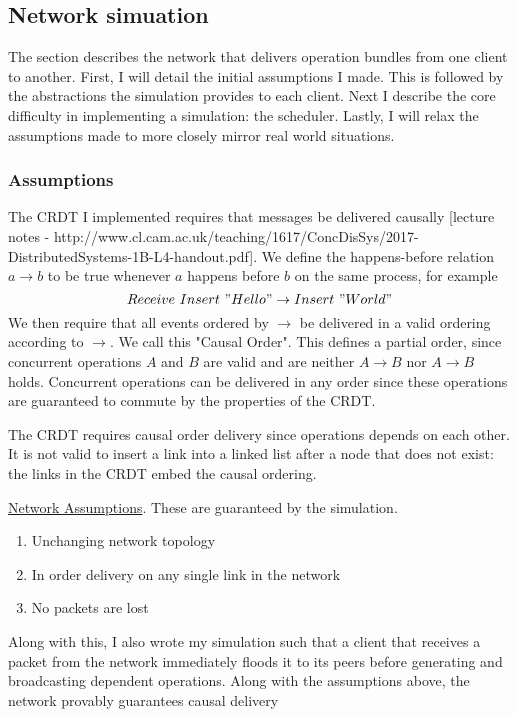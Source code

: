 \documentclass[12pt,a4paper,twoside,openright]{report}
\begin{document}
	\subsection{Network simuation}
		The section describes the network that delivers operation bundles from one client to another. First, I will detail the initial assumptions I made. This is followed by the abstractions the simulation provides to each client. Next I describe the core difficulty in implementing a simulation: the scheduler. Lastly, I will relax the assumptions made to more closely mirror real world situations.
		
		\subsubsection{Assumptions} 
		The CRDT I implemented requires that messages be delivered causally [lecture notes - http://www.cl.cam.ac.uk/teaching/1617/ConcDisSys/2017-DistributedSystems-1B-L4-handout.pdf]. We define the happens-before relation \(a \rightarrow b\) to be true whenever $a$ happens before $b$ on the same process, for example \[Receive\ Insert\ "Hello" \rightarrow Insert\ " World"\]
		We then require that all events ordered by $\rightarrow$ be delivered in a valid ordering according to $\rightarrow$. We call this "Causal Order". 	
		This defines a partial order, since concurrent operations $A$ and $B$ are valid and are neither $A \rightarrow B$ nor $A \rightarrow B$ holds. Concurrent operations can be delivered in any order since these operations are guaranteed to commute by the properties of the CRDT.
		
		The CRDT requires causal order delivery since operations depends on each other. It is not valid to insert a link into a linked list after a node that does not exist: the links in the CRDT embed the causal ordering.
		
		\underline{Network Assumptions}. These are guaranteed by the simulation.
		\begin{enumerate}
			\item Unchanging network topology
			\item In order delivery on any single link in the network
			\item No packets are lost
		\end{enumerate}
		
		Along with this, I also wrote my simulation such that a client that receives a packet from the network immediately floods it to its peers before generating and broadcasting dependent operations. Along with the assumptions above, the network provably guarantees causal delivery
		
\end{document}
